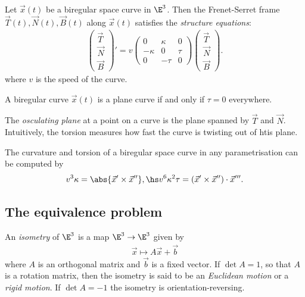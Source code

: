 \documentclass{article}
\begin{document}
\begin{theorem}
	Let $\vec x(t)$ be a biregular space curve in $\E^3$. Then the Frenet-Serret
	frame $\vec T(t), \vec N(t), \vec B(t)$ along $\vec x(t)$ satisfies the
	\emph{structure equations}:
	\begin{align*}
		\begin{pmatrix}
			\vec T \\
			\vec N \\
			\vec B
		\end{pmatrix}'
		= v\begin{pmatrix}
			0       & \kappa & 0    \\
			-\kappa & 0      & \tau \\
			0       & -\tau  & 0
		\end{pmatrix}
		\begin{pmatrix}
			\vec T \\
			\vec N \\
			\vec B
		\end{pmatrix}.
	\end{align*}
	where $v$ is the speed of the curve.
\end{theorem}

\begin{theorem}
	A biregular curve $\vec x(t)$ is a plane curve if and only if $\tau=0$ everywhere.
\end{theorem}

\begin{definition}
	The \emph{osculating plane} at a point on a curve is the plane spanned by $\vec T$ and
	$\vec N$. Intuitively, the torsion measures how fast the curve is twisting out of htis plane.
\end{definition}

\begin{theorem}
	The curvature and torsion of a biregular space curve in any parametrisation can be
	computed by
	\begin{align*}
		v^3\kappa = \abs{\vec x' \times \vec x''},\hs
		v^6\kappa^2\tau = (\vec x' \times \vec x'') \cdot \vec x'''.
	\end{align*}
\end{theorem}

\subsection{The equivalence problem}

\begin{definition}
	An \emph{isometry} of $\E^3$ is a map $\E^3\to\E^3$ given by
	\begin{align*}
		\vec x \mapsto A\vec x + \vec b
	\end{align*}
	where $A$ is an orthogonal matrix and $\vec b$ is a fixed vector. If $\det A = 1$,
	so that $A$ is a rotation matrix, then the isometry is said to be an \emph{Euclidean motion}
	or a \emph{rigid motion}. If $\det A = -1$ the isometry is orientation-reversing.
\end{definition}
\end{document}
